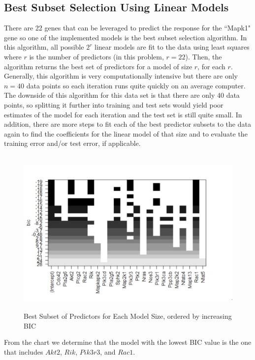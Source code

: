 \documentclass{article}
\begin{document}
\subsection{Best Subset Selection Using Linear Models}
There are 22 genes that can be leveraged to predict the response for the ``Mapk1" gene so one of the implemented models is the best subset selection algorithm.  In this algorithm, all possible $2^r$ linear models are fit to the data using least squares where $r$ is the number of predictors (in this problem, $r=22$).  Then, the algorithm returns the best set of predictors for a model of size $r$, for each $r$.  Generally, this algorithm is very computationally intensive but there are only $n=40$ data points so each iteration runs quite quickly on an average computer.  The downside of this algorithm for this data set is that there are only 40 data points, so splitting it further into training and test sets would yield poor estimates of the model for each iteration and the test set is still quite small.  In addition, there are more steps to fit each of the best predictor subsets to the data again to find the coefficients for the linear model of that size and to evaluate the training error and/or test error, if applicable.\\
\null\\
\begin{figure}[H]
	\caption{Best Subset of Predictors for Each Model Size, ordered by increasing BIC}
	\includegraphics[scale=0.60]{best_subsets}
	\centering
	\label{fig:best_subsets}
\end{figure}
From the chart we determine that the model with the lowest BIC value is the one that includes $Akt2$, $Rik$, $Pik3r3$, and $Rac1$.  
\end{document}

